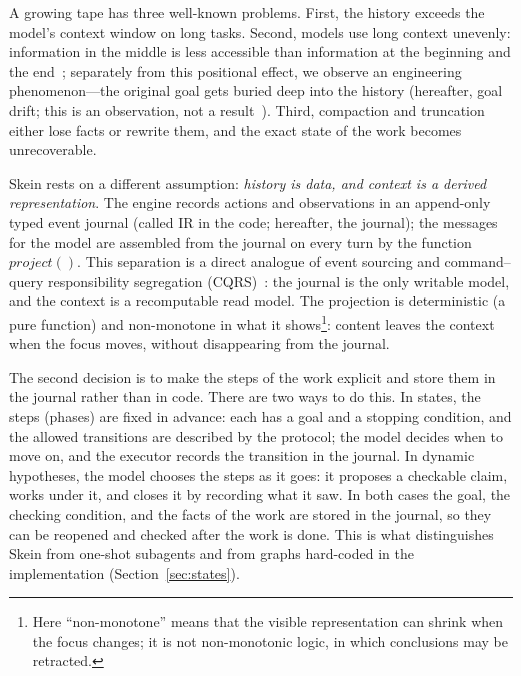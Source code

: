 \documentclass[11pt,a4paper]{article}
\begin{document}
A growing tape has three well-known problems. First, the history exceeds the model's context window on
long tasks. Second, models use long context unevenly: information in the middle is less
accessible than information at the beginning and the end~\cite{liu2023lost}; separately from
this positional effect, we observe an engineering phenomenon---the original goal gets buried deep
into the history (hereafter, goal drift; this is an observation, not a
result~\cite{liu2023lost}). Third, compaction and truncation either lose facts or rewrite them,
and the exact state of the work becomes unrecoverable.

Skein rests on a different assumption: \emph{history is data, and context is a derived
representation}. The engine records actions and observations in an append-only typed event
journal (called IR in the code; hereafter, the journal); the messages for the model are
assembled from the journal on every turn by the function $project()$. This separation is a
direct analogue of event sourcing and command--query responsibility segregation
(CQRS)~\cite{fowler2005event,fowler2011cqrs}: the journal is the only writable model, and the
context is a recomputable read model. The projection is deterministic (a pure function) and
non-monotone in what it shows\footnote{Here ``non-monotone'' means that the visible representation can
shrink when the focus changes; it is not non-monotonic logic, in which conclusions may be
retracted.}: content leaves the context when the focus moves, without disappearing from the
journal.

The second decision is to make the steps of the work explicit and store them in the journal rather
than in code. There are two ways to do this. In states, the steps (phases) are fixed in advance:
each has a goal and a stopping condition, and the allowed transitions are described by the
protocol; the model decides when to move on, and the executor records the transition in the
journal. In dynamic hypotheses, the model chooses the steps as it goes: it proposes a checkable
claim, works under it, and closes it by recording what it saw. In both cases the goal, the
checking condition, and the facts of the work are stored in the journal, so they can be reopened
and checked after the work is done. This is what distinguishes Skein from one-shot subagents and
from graphs hard-coded in the implementation (Section~\ref{sec:states}).
\end{document}

